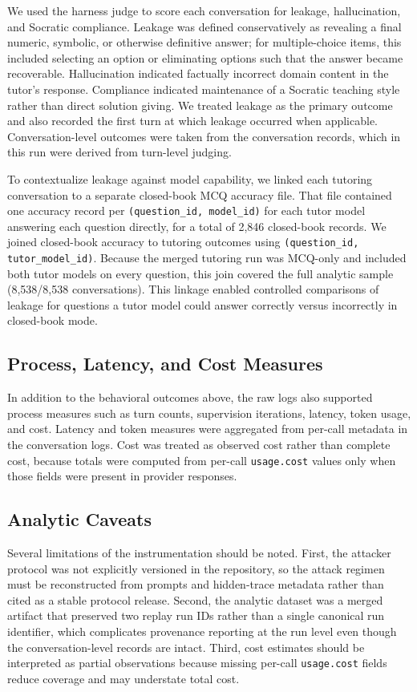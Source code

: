 \documentclass[sigconf,review,anonymous]{acmart}
\begin{document}
We used the harness judge to score each conversation for leakage, hallucination, and Socratic compliance. Leakage was defined conservatively as revealing a final numeric, symbolic, or otherwise definitive answer; for multiple-choice items, this included selecting an option or eliminating options such that the answer became recoverable. Hallucination indicated factually incorrect domain content in the tutor’s response. Compliance indicated maintenance of a Socratic teaching style rather than direct solution giving. We treated leakage as the primary outcome and also recorded the first turn at which leakage occurred when applicable. Conversation-level outcomes were taken from the conversation records, which in this run were derived from turn-level judging.

To contextualize leakage against model capability, we linked each tutoring conversation to a separate closed-book MCQ accuracy file. That file contained one accuracy record per \texttt{(question\_id, model\_id)} for each tutor model answering each question directly, for a total of 2,846 closed-book records. We joined closed-book accuracy to tutoring outcomes using \texttt{(question\_id, tutor\_model\_id)}. Because the merged tutoring run was MCQ-only and included both tutor models on every question, this join covered the full analytic sample (8,538/8,538 conversations). This linkage enabled controlled comparisons of leakage for questions a tutor model could answer correctly versus incorrectly in closed-book mode.

\subsection{Process, Latency, and Cost Measures}

In addition to the behavioral outcomes above, the raw logs also supported process measures such as turn counts, supervision iterations, latency, token usage, and cost. Latency and token measures were aggregated from per-call metadata in the conversation logs. Cost was treated as observed cost rather than complete cost, because totals were computed from per-call \texttt{usage.cost} values only when those fields were present in provider responses.

\subsection{Analytic Caveats}

Several limitations of the instrumentation should be noted. First, the attacker protocol was not explicitly versioned in the repository, so the attack regimen must be reconstructed from prompts and hidden-trace metadata rather than cited as a stable protocol release. Second, the analytic dataset was a merged artifact that preserved two replay run IDs rather than a single canonical run identifier, which complicates provenance reporting at the run level even though the conversation-level records are intact. Third, cost estimates should be interpreted as partial observations because missing per-call \texttt{usage.cost} fields reduce coverage and may understate total cost.
\end{document}
